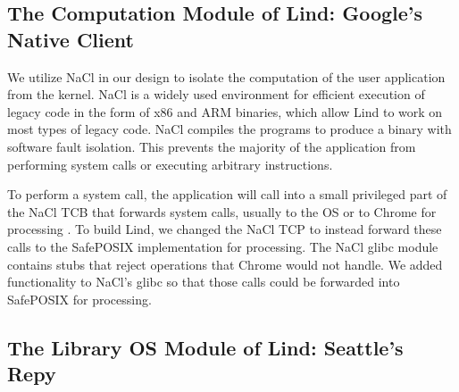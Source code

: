 \subsection{The Computation Module of Lind: Google's Native Client}

We utilize NaCl in our design to isolate the computation of the user application
 from the kernel.
NaCl is a widely used environment for efficient execution of legacy code in the
form of x86 and ARM binaries, which allow Lind to work on most types of legacy code.
NaCl compiles the programs to produce a binary with software fault isolation.
This prevents the majority of the application from performing system calls
or executing arbitrary instructions.

To perform a system call, the application will call into a small privileged
part of the NaCl TCB that forwards system calls, usually to the OS or to Chrome for
processing .  To build Lind, we changed the NaCl TCP to
instead forward these calls to the SafePOSIX implementation
for processing.  The NaCl
glibc module contains stubs that reject operations
that Chrome would not handle.  We added functionality to NaCl's glibc so that
those calls could be forwarded into SafePOSIX for processing.


%

\subsection{The Library OS Module of Lind: Seattle's Repy}

